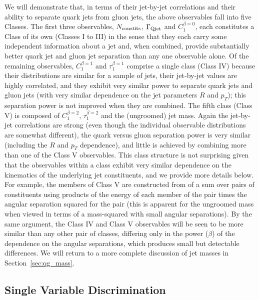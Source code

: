 We will demonstrate that, in terms of their jet-by-jet correlations and their ability to separate quark jets from gluon jets, 
the above observables fall into five Classes.  The first three observables, $N_{\rm constits}$, 
$\Gamma_{\rm Qjet}$ and $C_1^{\beta=0}$, each constitutes a Class of its own  (Classes I to III) in the sense that they each carry some independent information 
about a jet and, when combined, provide substantially better quark jet and gluon jet separation than any one observable alone.  Of the remaining
observables, $C_1^{\beta=1}$ and $\tau_1^{\beta=1}$ comprise a single class (Class IV) because their distributions are  similar 
for a sample of jets, their jet-by-jet values are highly correlated, and they exhibit very similar power to separate 
quark jets and gluon jets (with very similar dependence on the jet parameters $R$ and $p_T$); this separation power is not improved
when they are combined.  The fifth class (Class V) is composed of $C_1^{\beta=2}$, $\tau_1^{\beta=2}$ and the (ungroomed) jet mass.  Again the 
jet-by-jet correlations are strong (even though the individual observable distributions are somewhat different), the quark versus gluon separation power is very similar
(including the $R$ and $p_T$ dependence), and little is achieved by combining more than one of the Class V observables.  This class structure is
not surprising given that the observables within a class exhibit very similar dependence on the kinematics of the underlying jet constituents, and we provide more  details below.     
For example, the members of Class V are constructed from of a sum over pairs of constituents using products of the energy of each member 
of the pair times the angular separation squared for the pair (this is apparent for the ungroomed mass when viewed in terms of a mass-squared with small angular separations).  
By the same argument, the Class IV and Class V observables will be seen to be more similar than any other pair of classes, differing only in the
power ($\beta$) of the dependence on the angular separations, which  produces small but detectable differences.  
We will return to
 a more complete discussion of jet masses in Section~\ref{sec:qg_mass}.


\subsection{Single Variable Discrimination}


